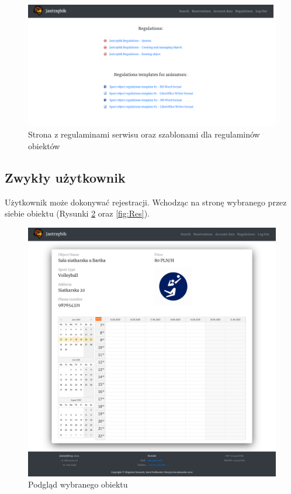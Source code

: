 \documentclass[a4paper,11pt]{article}
\begin{document}
    \begin{figure}[H] 
    	\begin{center}
    		\includegraphics[width=1\textwidth]{img3/Regulations.png}
            \caption{Strona z regulaminami serwisu oraz szablonami dla regulaminów obiektów}
            \label{fig:Data}
    	\end{center}
    \end{figure}   
    
    
    \subsection{Zwykły użytkownik}

    Użytkownik może dokonywać rejestracji. Wchodząc na stronę wybranego przez siebie obiektu (Rysunki \ref{fig:Obj} oraz \ref{fig:Res}).
    
    \begin{figure}[H] 
    	\begin{center}
    		\includegraphics[width=1\textwidth]{img3/ObjPage.png}
            \caption{Podgląd wybranego obiektu}
            \label{fig:Obj}
    	\end{center}
    \end{figure}
    
\end{document}
